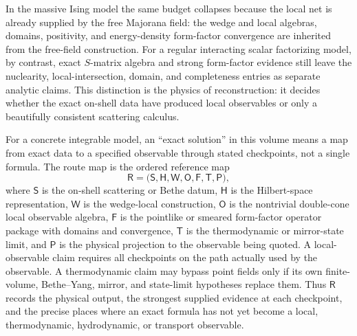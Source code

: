 \begin{remark}
In the massive Ising model the same budget collapses because the local net is
already supplied by the free Majorana field: the wedge and local algebras,
domains, positivity, and energy-density form-factor convergence are inherited
from the free-field construction.  For a regular interacting scalar
factorizing model, by contrast, exact \(S\)-matrix algebra and strong
form-factor evidence still leave the nuclearity, local-intersection, domain,
and completeness entries as separate analytic claims.  This distinction is
the physics of reconstruction: it decides whether the exact on-shell data
have produced local observables or only a beautifully consistent scattering
calculus.
\end{remark}

\begin{remark}
\label{ca:integrable-end-to-end-reconstruction-route-ledger}
For a concrete integrable model, an ``exact solution'' in this volume means a
map from exact data to a specified observable through stated checkpoints, not a
single formula.  The route map is the ordered reference map
\[
  \mathsf R
  =
  \bigl(
  \mathsf S,\mathsf H,\mathsf W,\mathsf O,
  \mathsf F,\mathsf T,\mathsf P
  \bigr),
\]
where \(\mathsf S\) is the on-shell scattering or Bethe datum,
\(\mathsf H\) is the Hilbert-space representation, \(\mathsf W\) is the
wedge-local construction, \(\mathsf O\) is the nontrivial double-cone local
observable algebra, \(\mathsf F\) is the pointlike or smeared form-factor
operator package with domains and convergence, \(\mathsf T\) is the
thermodynamic or mirror-state limit, and \(\mathsf P\) is the physical
projection to the observable being quoted.  A local-observable claim requires
all checkpoints on the path actually used by the observable.  A thermodynamic
claim may bypass point fields only if its own finite-volume, Bethe--Yang,
mirror, and state-limit hypotheses replace them.  Thus \(\mathsf R\) records
the physical output, the strongest supplied evidence at each checkpoint, and the
precise places where an exact formula has not yet become a local,
thermodynamic, hydrodynamic, or transport observable.


\end{remark}
